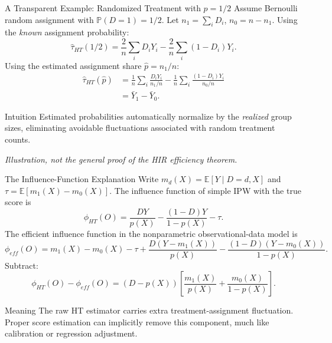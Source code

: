 \documentclass[aspectratio=169,11pt]{beamer}
\newcommand{\E}{\mathbb{E}}
\newcommand{\Pp}{\mathbb{P}}
\begin{document}
\begin{frame}{A Transparent Example: Randomized Treatment with $p=1/2$}
\small
Assume Bernoulli random assignment with \(\Pp(D=1)=1/2\). Let \(n_1=\sum_i D_i\), \(n_0=n-n_1\).
\medskip
Using the \emph{known} assignment probability:
\[
\hat\tau_{HT}(1/2)=\frac{2}{n}\sum_i D_iY_i-\frac{2}{n}\sum_i(1-D_i)Y_i.
\]
Using the estimated assignment share \(\hat p=n_1/n\):
\begin{align*}
\hat\tau_{HT}(\hat p)
&=\frac{1}{n}\sum_i\frac{D_iY_i}{n_1/n}-\frac{1}{n}\sum_i\frac{(1-D_i)Y_i}{n_0/n}\\
&=\boxed{\bar Y_1-\bar Y_0}.
\end{align*}
\begin{block}{Intuition}
Estimated probabilities automatically normalize by the \emph{realized} group sizes, eliminating avoidable fluctuations associated with random treatment counts.
\end{block}
\textit{Illustration, not the general proof of the HIR efficiency theorem.}
\end{frame}

\begin{frame}{The Influence-Function Explanation}
\footnotesize
Write \(m_d(X)=\E[Y\mid D=d,X]\) and \(\tau=\E[m_1(X)-m_0(X)]\).
\medskip
The influence function of simple IPW with the true score is
\[
\phi_{HT}(O)=\frac{DY}{p(X)}-\frac{(1-D)Y}{1-p(X)}-\tau.
\]
The efficient influence function in the nonparametric observational-data model is
\[
\phi_{eff}(O)=m_1(X)-m_0(X)-\tau
+\frac{D(Y-m_1(X))}{p(X)}-\frac{(1-D)(Y-m_0(X))}{1-p(X)}.
\]
Subtract:
\[
\boxed{\phi_{HT}(O)-\phi_{eff}(O)
=(D-p(X))\left[\frac{m_1(X)}{p(X)}+\frac{m_0(X)}{1-p(X)}\right].}
\]
\begin{block}{Meaning}
The raw HT estimator carries extra treatment-assignment fluctuation. Proper score estimation can implicitly remove this component, much like calibration or regression adjustment.
\end{block}
\end{frame}
\end{document}

